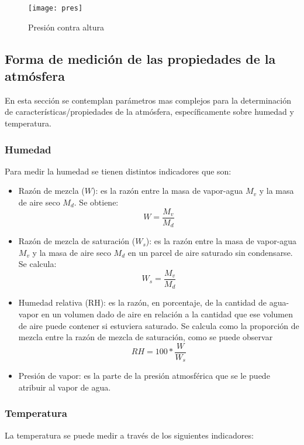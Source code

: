 \documentclass[12pt,letterpaper]{article}
\begin{document}
\begin{figure}[H]
	\centering
	\texttt{[image: pres]}
	\caption{Presión contra altura \cite{a}}
\end{figure}

\subsection{Forma de medición de las propiedades de la atmósfera}

En esta sección se contemplan parámetros mas complejos para la determinación de características/propiedades de la atmósfera, específicamente sobre humedad y temperatura.

\subsubsection{Humedad}
 Para medir la humedad se tienen distintos indicadores que son:
 \begin{itemize}
 \item Razón de mezcla ($W$): es la razón entre la masa de vapor-agua $M_{v}$ y la masa de aire seco $M_{d}$\cite{f}. Se obtiene:
 $$ W = \frac{M_{v}}{M_{d}} $$
 \item Razón de mezcla de saturación ($W_{s}$):  es la razón entre la masa de vapor-agua $M_{v}$ y la masa de aire seco $M_{d}$ en un parcel de aire saturado sin condensarse\cite{f}. Se calcula:
  $$ W_{s} = \frac{M_{v}}{M_{d}} $$
  \item Humedad relativa (RH): es la razón, en porcentaje, de la cantidad de agua-vapor en un volumen dado de aire en relación a la cantidad que ese volumen de aire puede contener si estuviera saturado\cite{f}. Se calcula como la proporción de mezcla entre la razón de mezcla de saturación, como se puede observar\cite{f}
  $$ RH = 100*\frac{W}{W_{s}} $$
  \item Presión de vapor: es la parte de la presión atmosférica que se le puede atribuir al vapor de agua\cite{f}.
 \end{itemize}

\subsubsection{Temperatura}
La temperatura se puede medir a través de los siguientes indicadores:
\end{document}
